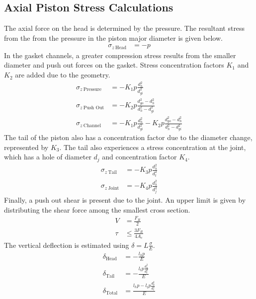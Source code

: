 \documentclass[10pt,a4paper]{article}
\begin{document}
	\subsection*{Axial Piston Stress Calculations}
	The axial force on the head is determined by the pressure. The resultant stress from the from the pressure in the piston major diameter is given below.
	\begin{align}
		\sigma_{z\ \text{Head}} &= - p
	\end{align}
	In the gasket channels, a greater compression stress results from the smaller diameter and push out forces on the gasket. Stress concentration factors $K_1$ and $K_2$ are added due to the geometry.
	\begin{align}
		\sigma_{z\ \text{Pressure}} &= - K_1 p \frac{d_h^2}{d_{gi}^2} \\
		\sigma_{z\ \text{Push Out}} &= - K_2 p \frac{d_{go}^2 - d_h^2}{d_h^2 - d_{gi}^2}\\
		\sigma_{z\ \text{Channel}} &= - K_1 p \frac{d_h^2}{d_{gi}^2} - K_2 p \frac{d_{go}^2 - d_h^2}{d_h^2 - d_{gi}^2}
	\end{align}
	The tail of the piston also has a concentration factor due to the diameter change, represented by $K_3$. The tail also experiences a stress concentration at the joint, which has a hole of diameter $d_j$ and concentration factor $K_4$.
	\begin{align}
		\sigma_{z\ \text{Tail}} &= -K_3 p \frac{d_h^2}{d_t^2}\\
		\sigma_{z\ \text{Joint}} &= - K_4 p \frac{d_h^2}{d_j^2}
	\end{align}
	Finally, a push out shear is present due to the joint. An upper limit is given by distributing the shear force among the smallest cross section.
	\begin{align}
		V &= \frac{F_R}{2}\\
		\tau &\leq \frac{3 F_R}{4 A_c}
	\end{align}
	The vertical deflection is estimated using $\delta = L \frac{\sigma}{E}$.
	\begin{align}
		\delta_{\text{Head}} &= - \frac{l_h p}{E}\\ 
		\delta_{\text{Tail}} &= - \frac{l_t p \frac{d_h^2}{d_t^2}}{E}\\ 
		\delta_{\text{Total}} &=  \frac{l_h p -l_t p \frac{d_h^2}{d_t^2}}{E}
	\end{align}
	
\end{document}
